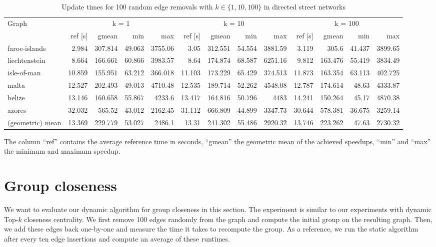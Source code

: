\begin{landscape}
\begin{table}[h!]
\centering
\begin{tabular}{l|rrrr|rrrr|rrrr}
\toprule
Graph & \multicolumn{4}{c|}{k = 1} & \multicolumn{4}{c|}{k = 10} & \multicolumn{4}{c}{k = 100}\\
                &     ref [s] &   gmean &   min &     max &     ref [s] &   gmean &   min &     max &     ref [s] &   gmean &   min &     max \\
\midrule \midrule
 faroe-islands    &  2.984 & 307.814 & 49.063 & 3755.06  &  3.05  & 312.551 & 54.554 & 3881.59  &  3.119 & 305.6   & 41.437 & 3899.65  \\
 liechtenstein    &  8.664 & 166.661 & 60.866 & 3983.57  &  8.64  & 174.874 & 68.587 & 6251.16  &  9.812 & 163.476 & 55.419 & 3834.49  \\
 isle-of-man      & 10.859 & 155.951 & 63.212 &  366.018 & 11.103 & 173.229 & 65.429 &  374.513 & 11.873 & 163.354 & 63.113 &  402.725 \\
 malta            & 12.527 & 202.493 & 49.013 & 4710.48  & 12.535 & 189.714 & 52.262 & 4548.08  & 12.787 & 174.614 & 48.63  & 4333.87  \\
 belize           & 13.146 & 160.658 & 55.867 & 4233.6   & 13.417 & 164.816 & 50.796 & 4483     & 14.241 & 150.264 & 45.17  & 4870.38  \\
 azores           & 32.032 & 565.52  & 43.012 & 2162.45  & 31.112 & 666.809 & 44.899 & 3347.73  & 30.644 & 578.381 & 36.675 & 3259.14  \\ \midrule \midrule
 (geometric) mean & 13.369 & 229.779 & 53.027 & 2486.1   & 13.31  & 241.302 & 55.486 & 2920.32  & 13.746 & 223.262 & 47.63  & 2730.32  \\
\bottomrule
\end{tabular}
\caption{Update times for 100 random edge removals with  $k \in \{1, 10, 100\}$ in directed street networks}{The column ``ref'' contains the average reference time in seconds, ``gmean'' the geometric mean of the achieved speedups, ``min'' and ``max'' the minimum and maximum speedup.}
\label{tbl:removalsDirectedStreet}
\end{table}

\end{landscape}


\section{Group closeness}
We want to evaluate our dynamic algorithm for group closeness in this section. The experiment is similar to our experiments with dynamic Top-$k$ closeness centrality. We first remove 100 edges randomly from the graph and compute the initial group on the resulting graph. Then, we add these edges back one-by-one and measure the time it takes to recompute the group. As a reference, we run the static algorithm after every ten edge insertions and compute an average of these runtimes.

